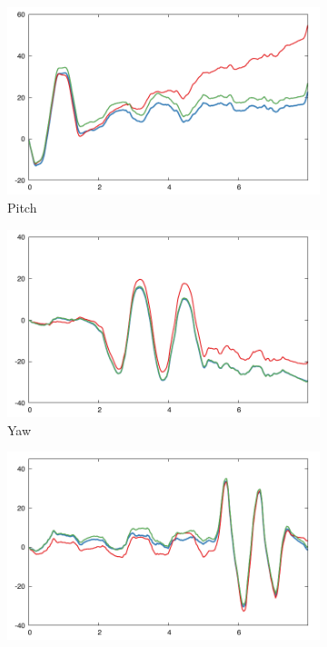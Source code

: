 \begin{figure}
    \centering
    \begin{subfigure}[b]{0.327\textwidth}
        \includegraphics[width=\textwidth]{madg_data/pitch.pdf}
	    \caption{Pitch}
    \label{fig:pitch}
    \end{subfigure}
    \hfill
    \begin{subfigure}[b]{0.327\textwidth}
        \includegraphics[width=\textwidth]{madg_data/yaw.pdf}
        \caption{Yaw}
        \label{fig:yaw}
    \end{subfigure}
    \hfill
    \begin{subfigure}[b]{0.327\textwidth}
        \includegraphics[width=\textwidth]{madg_data/roll.pdf}

\end{subfigure}
\end{figure}
